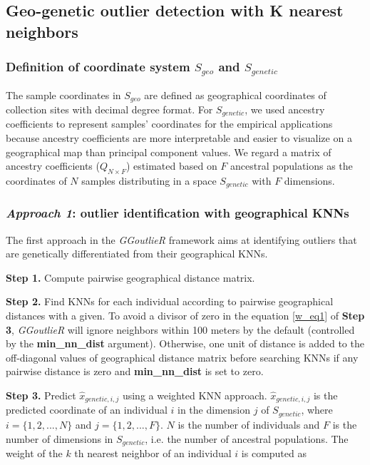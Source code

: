 \documentclass[11pt]{article}
\begin{document}
\subsection*{Geo-genetic outlier detection with K nearest neighbors}

\subsubsection*{Definition of coordinate system $S_{geo}$ and $S_{genetic}$}

The sample coordinates in $S_{geo}$ are defined as geographical coordinates of collection sites with decimal degree format.
For $S_{genetic}$, we used ancestry coefficients \citep{pritchard2000inference} to represent samples' coordinates for the empirical applications because ancestry coefficients are more interpretable and easier to visualize on a geographical map than principal component values.
We regard a matrix of ancestry coefficients ($Q_{N\times F}$) estimated based on $F$ ancestral populations as the coordinates of $N$ samples distributing in a space $S_{genetic}$ with $F$ dimensions.

\subsubsection*{\textit{Approach 1}: outlier identification with geographical KNNs}

The first approach in the \textit{GGoutlieR} framework aims at identifying outliers that are genetically differentiated from their geographical KNNs.

\textbf{Step 1.} Compute pairwise geographical distance matrix. 

\textbf{Step 2.} Find KNNs for each individual according to pairwise geographical distances with a given.
To avoid a divisor of zero in the equation \ref{w_eq1} of \textbf{Step 3}, \textit{GGoutlieR} will ignore neighbors within 100 meters by the default (controlled by the \textbf{min\_nn\_dist} argument).
Otherwise, one unit of distance is added to the off-diagonal values of geographical distance matrix before searching KNNs if any pairwise distance is zero and \textbf{min\_nn\_dist} is set to zero.

\textbf{Step 3.} Predict $\hat{x}_{genetic,i,j}$ using a weighted KNN approach.
$\hat{x}_{genetic,i,j}$ is the predicted coordinate of an individual $i$ in the dimension $j$ of $S_{genetic}$, where $i = \{1,2,...,N\}$ and $j = \{1,2,...,F\}$. $N$ is the number of individuals and $F$ is the number of dimensions in $S_{genetic}$, i.e. the number of ancestral populations. 
The weight of the $k$ th nearest neighbor of an individual $i$ is computed as
\end{document}
